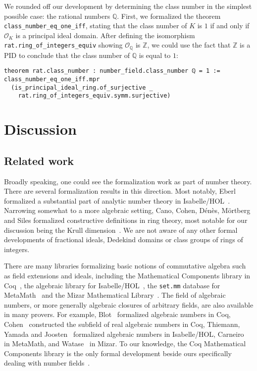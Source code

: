 \documentclass[sn-mathphys]{sn-jnl}%
\newcommand{\lean}[1]{\texttt{#1}\xspace}
\newcommand*{\OK}[1][K]{\mathcal{O}_{#1}}
\newcommand{\QQ}{\mathbb{Q}}
\renewcommand{\Z}{\mathbb{Z}}
\begin{document}
We rounded off our development by determining the class number in the simplest possible case: the rational numbers $\QQ$.
First, we formalized the theorem \lean{class\_number\_eq\_one\_iff}, stating that the class number of $K$ is $1$ if and only if $\OK$ is a principal ideal domain.
After defining the isomorphism \lean{rat.ring\_of\_integers\_equiv} showing $\OK[\QQ]$ is $\Z$,
we could use the fact that $\Z$ is a PID to conclude that the class number of $\QQ$ is equal to $1$:
\begin{lstlisting}
theorem rat.class_number : number_field.class_number ℚ = 1 :=
class_number_eq_one_iff.mpr
  (is_principal_ideal_ring.of_surjective _
    rat.ring_of_integers_equiv.symm.surjective)
\end{lstlisting}

\section{Discussion}

\subsection{Related work}

Broadly speaking, one could see the formalization work as part of number theory. There are several formalization results in this direction.
Most notably, Eberl formalized a substantial part of analytic number theory in Isabelle/HOL~\cite{Eberl19}.
Narrowing somewhat to a more algebraic setting,
Cano, Cohen, Dénès, Mörtberg and Siles formalized constructive definitions in ring theory, most notable for our discussion being the Krull dimension~\cite{linear-algebra-coq}.
We are not aware of any other formal developments of fractional ideals, Dedekind domains or class groups of rings of integers.

There are many libraries formalizing basic notions of commutative algebra such as field extensions and ideals, including the Mathematical Components library in Coq~\cite{mathcomp},
the algebraic library for Isabelle/HOL~\cite{algebra_isabelle},
the \texttt{set.mm} database for MetaMath~\cite{metamath} and the Mizar Mathematical Library~\cite{algebraic-hierarchy_mizar}.
The field of algebraic numbers, or more generally algebraic closures of arbitrary fields, are also available in many provers.
For example, Blot~\cite{algebraic-numbers-ccorn} formalized algebraic numbers in Coq,
Cohen~\cite{real-algebraic-numbers-coq} constructed the subfield of real algebraic numbers in Coq,
Thiemann, Yamada and Joosten~\cite{algebraic-numbers-isabelle} formalized algebraic numbers in Isabelle/HOL,
Carneiro~\cite{algebraic-numbers-metamath} in MetaMath,
and Watase~\cite{algebraic-numbers-mizar} in Mizar.
To our knowledge, the Coq Mathematical Components library is the only formal development beside ours specifically dealing with number fields~\cite[\texttt{field/algnum.v}]{mathcomp}.
\end{document}

